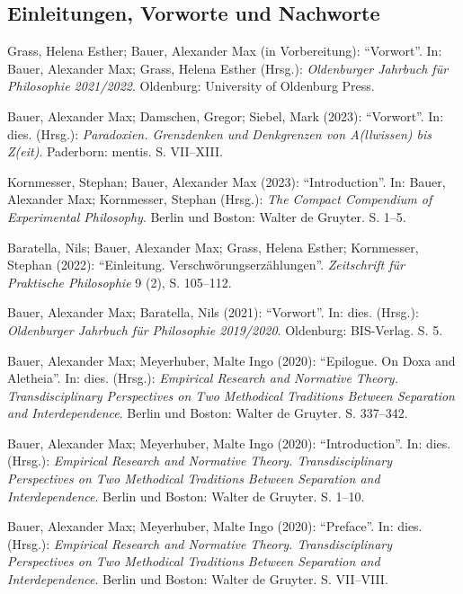 \documentclass[a4paper,10pt]{article}
\newenvironment{literature}{%
   \parskip6pt\parindent0pt\raggedright
   \def\lititem{\hangindent=1cm\hangafter1}}{%
   \par\ignorespaces}
\begin{document}
\subsection*{Einleitungen, Vorworte und Nachworte}
\begin{literature}
\lititem Grass, Helena Esther; Bauer, Alexander Max (in Vorbereitung): \enquote{Vorwort}. In: Bauer, Alexander Max; Grass, Helena Esther (Hrsg.): \textit{Oldenburger Jahrbuch für Philosophie 2021/2022}. Oldenburg: University of Oldenburg Press.

\lititem Bauer, Alexander Max; Damschen, Gregor; Siebel, Mark (2023): \enquote{Vorwort}. In: dies. (Hrsg.): \textit{Paradoxien. Grenzdenken und Denkgrenzen von A(llwissen) bis Z(eit)}. Paderborn: mentis. S. VII--XIII.

\lititem Kornmesser, Stephan; Bauer, Alexander Max (2023): \enquote{Introduction}. In: Bauer, Alexander Max; Kornmesser, Stephan (Hrsg.): \textit{The Compact Compendium of Experimental Philosophy}. Berlin und Boston: Walter de Gruyter. S. 1--5.

\lititem Baratella, Nils; Bauer, Alexander Max; Grass, Helena Esther; Kornmesser, Stephan (2022): \enquote{Einleitung. Verschwörungserzählungen}. \textit{Zeitschrift für Praktische Philosophie} 9 (2), S. 105--112.

\lititem Bauer, Alexander Max; Baratella, Nils (2021): \enquote{Vorwort}. In: dies. (Hrsg.): \textit{Oldenburger Jahrbuch für Philosophie 2019/2020}. Oldenburg: BIS-Verlag. S. 5.

\lititem Bauer, Alexander Max; Meyerhuber, Malte Ingo (2020): \enquote{Epilogue. On Doxa and Aletheia}. In: dies. (Hrsg.): \textit{Empirical Research and Normative Theory. Transdisciplinary Perspectives on Two Methodical Traditions Between Separation and Interdependence}. Berlin und Boston: Walter de Gruyter. S. 337--342.

\lititem Bauer, Alexander Max; Meyerhuber, Malte Ingo (2020): \enquote{Introduction}. In: dies. (Hrsg.): \textit{Empirical Research and Normative Theory. Transdisciplinary Perspectives on Two Methodical Traditions Between Separation and Interdependence}. Berlin und Boston: Walter de Gruyter. S. 1--10.

\lititem Bauer, Alexander Max; Meyerhuber, Malte Ingo (2020): \enquote{Preface}. In: dies. (Hrsg.): \textit{Empirical Research and Normative Theory. Transdisciplinary Perspectives on Two Methodical Traditions Between Separation and Interdependence}. Berlin und Boston: Walter de Gruyter. S. VII--VIII.


\end{literature}
\end{document}
